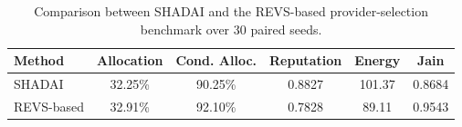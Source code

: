 \begin{table}[t]
\centering
\caption{Comparison between SHADAI and the REVS-based provider-selection benchmark over 30 paired seeds.}
\label{tab:c24_revs}
\begin{tabular}{lccccc}
\hline
Method & Allocation & Cond. Alloc. & Reputation & Energy & Jain \\
\hline
SHADAI & 32.25\% & 90.25\% & 0.8827 & 101.37 & 0.8684 \\
REVS-based & 32.91\% & 92.10\% & 0.7828 & 89.11 & 0.9543 \\
\hline
\end{tabular}
\end{table}